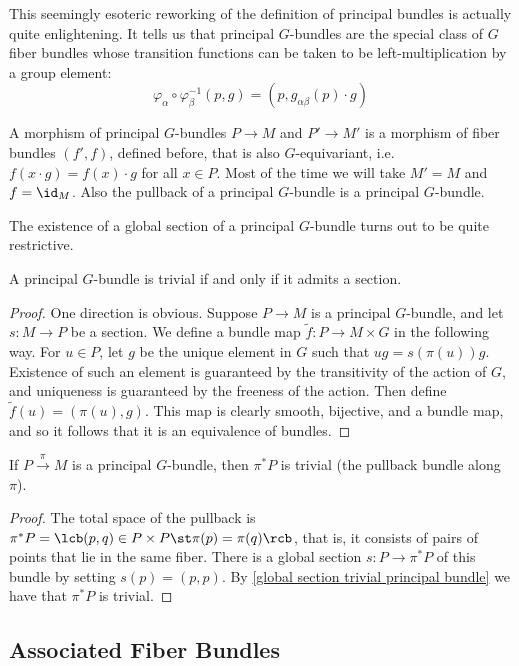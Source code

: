 This seemingly esoteric reworking of the definition of principal bundles is actually quite enlightening. It tells us that principal $G$-bundles are the special class of $G$ fiber bundles whose transition functions can be taken to be left-multiplication by a group element:
\[ \varphi_\alpha \circ \varphi_\beta^{-1}(p,g) = (p, g_{\alpha\beta}(p) \cdot g) \]


A morphism of principal $G$-bundles $P \rightarrow M$ and $P' \rightarrow M'$ is a morphism of fiber bundles $(f',f)$, defined before, that is also $G$-equivariant, i.e. $f(x \cdot g) = f(x) \cdot g$ for all $x \in P$. Most of the time we will take $M' = M$ and $f = \id_M$. Also the pullback of a principal $G$-bundle is a principal $G$-bundle. 


The existence of a global section of a principal $G$-bundle turns out to be quite restrictive.
\begin{prop}
\label{global section trivial principal bundle}
A principal $G$-bundle is trivial if and only if it admits a section.
\end{prop}
\begin{proof}
One direction is obvious. Suppose $P \rightarrow M$ is a principal $G$-bundle, and let $s : M \rightarrow P$ be a section. We define a bundle map $\tilde{f} : P \rightarrow M \times G$ in the following way. For $u \in P$, let $g$ be the unique element in $G$ such that $ug = s(\pi(u))g$. Existence of such an element is guaranteed by the transitivity of the action of $G$, and uniqueness is guaranteed by the freeness of the action. Then define $\tilde{f}(u) = (\pi(u),g)$. This map is clearly smooth, bijective, and a bundle map, and so it follows that it is an equivalence of bundles.
\end{proof}
\begin{cor}
If $P \stackrel{\pi}{\rightarrow} M$ is a principal $G$-bundle, then $\pi^* P$ is trivial (the pullback bundle along $\pi$).
\end{cor}
\begin{proof}
The total space of the pullback is $\pi^* P = \lcb (p,q) \in P \times P \st \pi(p) = \pi(q) \rcb$, that is, it consists of pairs of points that lie in the same fiber. There is a global section $s : P \rightarrow \pi^* P$ of this bundle by setting $s(p) = (p,p)$. By \cref{global section trivial principal bundle} we have that $\pi^* P$ is trivial.
\end{proof}




\subsection{Associated Fiber Bundles}


